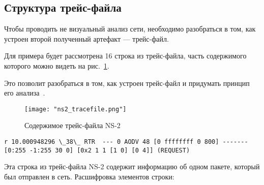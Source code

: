 \subsection{Структура трейс-файла}

Чтобы проводить не визуальный анализ сети, необходимо разобраться в том, как устроен второй полученный артефакт --- трейс-файл.

Для примера будет рассмотрена 16 строка из трейс-файла, часть содержимого которого можно видеть на рис.~\ref{fig:ns2_tracefile}.

Это позволит разобраться в том, как устроен трейс-файл и придумать принцип его анализа~\cite{salleh2006trace}.

\begin{figure}[!h]
  \centering
  \texttt{[image: "ns2\_tracefile.png"]}
  \caption{Содержимое трейс-файла NS-2}
  \label{fig:ns2_tracefile}
\end{figure}

\begin{verbatim}
r 10.000948296 \_38\_ RTR  --- 0 AODV 48 [0 ffffffff 0 800] ------- 
[0:255 -1:255 30 0] [0x2 1 1 [1 0] [0 4]] (REQUEST)
\end{verbatim}
Эта строка из трейс-файла NS-2 содержит информацию об одном пакете, который был отправлен в сеть. 
Расшифровка элементов строки:

